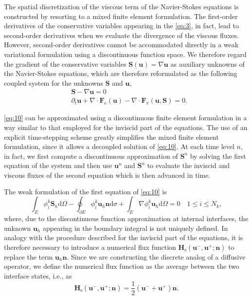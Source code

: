 \documentclass{develop-note}
\begin{document}
The spatial discretization of the viscous term of the Navier-Stokes equations is constructed by resorting to a mixed finite element formulation. The first-order derivatives of the conservative variables appearing in the \autoref{eq:3}, in fact, lead to second-order derivatives when we evaluate the divergence of the viscous fluxes. However, second-order derivatives cannot be accommodated directly in a weak variational formulation using a discontinuous function space. We therefore regard the gradient of the conservative variables $\mathbf{S}(\mathbf{u})=\nabla\mathbf{u}$ as auxiliary unknowns of the Navier-Stokes equations, which are therefore reformulated as the following coupled system for the unknowns $\mathbf{S}$ and $\mathbf{u}$,
\begin{equation}
  \label{eq:10}
  \begin{aligned}
    &\mathbf{S}-\nabla\mathbf{u}=0\\
    &\partial_{t}\mathbf{u}+\nabla\cdot\mathbf{F}_{\mathrm{e}}(\mathbf{u})-\nabla\cdot\mathbf{F}_{\mathrm{v}}(\mathbf{u},\mathbf{S})=0.
  \end{aligned}
\end{equation}

\autoref{eq:10} can be approximated using a discontinuous finite element formulation in a way similar to that employed for the inviscid part of the equations. The use of an explicit time-stepping scheme greatly simplifies the mixed finite element formulation, since it allows a decoupled solution of \autoref{eq:10}. At each time level $n$, in fact, we first compute a discontinuous approximation of $\mathbf{S}^{n}$ by solving the first equation of the system and then use $\mathbf{u}^{n}$ and $\mathbf{S}^{n}$ to evaluate the inviscid and viscous fluxes of the second equation which is then advanced in time.

The weak formulation of the first equation of \autoref{eq:10} is
\begin{equation}
  \label{eq:11}
  \int_{E}\phi_{i}^{k}\mathbf{S}_{h}\mathrm{d}\Omega-\oint_{\partial E}\phi_{i}^{k}\mathbf{u}_{h}\mathbf{n}\mathrm{d}\sigma+\int_{E}\nabla\phi_{i}^{k}\mathbf{u}_{h}\mathrm{d}\Omega=0\quad 1\leqslant i\leqslant N_{k},
\end{equation}
where, due to the discontinuous function approximation at internal interfaces, the unknown $\mathbf{u}_{h}$ appearing in the boundary integral is not uniquely defined. In analogy with the procedure described for the inviscid part of the equations, it is therefore necessary to introduce a numerical flux function $\mathbf{H}_{\mathrm{s}}(\mathbf{u}^{-},\mathbf{u}^{+};\mathbf{n})$ to replace the term $\mathbf{u}_{h}\mathbf{n}$. Since we are constructing the discrete analog of a diffusive operator, we define the numerical flux function as the average between the two interface states, i.e., as
\begin{equation}
  \label{eq:12}
  \mathbf{H}_{\mathrm{s}}(\mathbf{u}^{-},\mathbf{u}^{+};\mathbf{n})=\dfrac{1}{2}(\mathbf{u}^{-}+\mathbf{u}^{+})\mathbf{n}.
\end{equation}
\end{document}
